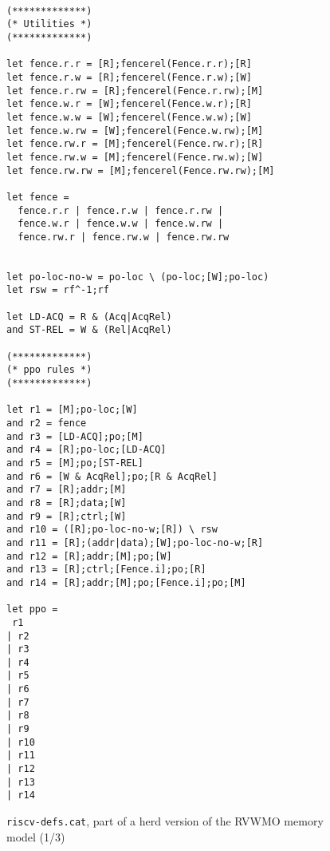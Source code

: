 \begin{figure}[h!]
  {
  \tt\bfseries\centering\footnotesize
  \begin{lstlisting}
(*************)
(* Utilities *)
(*************)

let fence.r.r = [R];fencerel(Fence.r.r);[R]
let fence.r.w = [R];fencerel(Fence.r.w);[W]
let fence.r.rw = [R];fencerel(Fence.r.rw);[M]
let fence.w.r = [W];fencerel(Fence.w.r);[R]
let fence.w.w = [W];fencerel(Fence.w.w);[W]
let fence.w.rw = [W];fencerel(Fence.w.rw);[M]
let fence.rw.r = [M];fencerel(Fence.rw.r);[R]
let fence.rw.w = [M];fencerel(Fence.rw.w);[W]
let fence.rw.rw = [M];fencerel(Fence.rw.rw);[M]

let fence = 
  fence.r.r | fence.r.w | fence.r.rw |
  fence.w.r | fence.w.w | fence.w.rw |
  fence.rw.r | fence.rw.w | fence.rw.rw


let po-loc-no-w = po-loc \ (po-loc;[W];po-loc)
let rsw = rf^-1;rf

let LD-ACQ = R & (Acq|AcqRel)
and ST-REL = W & (Rel|AcqRel)

(*************)
(* ppo rules *)
(*************)

let r1 = [M];po-loc;[W]
and r2 = fence
and r3 = [LD-ACQ];po;[M]
and r4 = [R];po-loc;[LD-ACQ]
and r5 = [M];po;[ST-REL]
and r6 = [W & AcqRel];po;[R & AcqRel]
and r7 = [R];addr;[M]
and r8 = [R];data;[W]
and r9 = [R];ctrl;[W]
and r10 = ([R];po-loc-no-w;[R]) \ rsw
and r11 = [R];(addr|data);[W];po-loc-no-w;[R]
and r12 = [R];addr;[M];po;[W]
and r13 = [R];ctrl;[Fence.i];po;[R]
and r14 = [R];addr;[M];po;[Fence.i];po;[M]

let ppo =
 r1
| r2
| r3
| r4
| r5
| r6
| r7
| r8
| r9
| r10
| r11
| r12
| r13
| r14
\end{lstlisting}
  }
  \caption{{\tt riscv-defs.cat}, part of a herd version of the RVWMO memory model (1/3)}
  \label{fig:herd1}
\end{figure}

